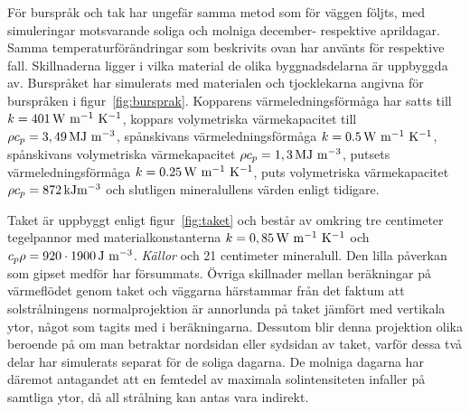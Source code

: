 För burspråk och tak har ungefär samma metod som för väggen följts, med simuleringar motsvarande soliga och
molniga december- respektive aprildagar. Samma temperaturförändringar som beskrivits ovan har använts för
respektive fall. Skillnaderna ligger i vilka material de olika byggnadsdelarna är uppbyggda av.
Burspråket har simulerats med materialen och tjocklekarna angivna för burspråken i figur~\ref{fig:bursprak}.
Kopparens värmeledningsförmåga har satts till $k=\unit[401]{W~m^{-1}~K^{-1}}$, koppars volymetriska värmekapacitet till $\rho c_p = \unit[3,49]{MJ~m^{-3}}$, spånskivans värmeledningsförmåga $k = \unit[0.5]{W~m^{-1}~K^{-1}}$, spånskivans volymetriska
värmekapacitet $\rho c_p = \unit[1,3]{MJ~m^{-3}}$, putsets värmeledningsförmåga $k = \unit[0.25]{W~m^{-1}~K^{-1}}$, puts volymetriska
värmekapacitet $\rho c_p = \unit[872]{kJm^{-3}}$ och slutligen mineralullens värden
enligt tidigare.
\cite{engineeringcom}\cite{kandidatarbete2010}\cite{engineeringtoolboxthermalconductivity}\cite{engineeringtoolboxspecificheat}

Taket är uppbyggt enligt figur~\ref{fig:taket} och består av omkring tre centimeter tegelpannor med materialkonstanterna $k = \unit[0,85]{W~m^{-1}~K^{-1}}$ och $c_p\rho = \unit[920\cdot 1900]{J~m^{-3}}$.
\emph{\color{red} Källor} och 21 centimeter mineralull. Den lilla påverkan som gipset medför har försummats. Övriga skillnader mellan beräkningar på värmeflödet genom taket och väggarna härstammar från det faktum att solstrålningens normalprojektion är annorlunda på taket jämfört med vertikala ytor, något som tagits med i beräkningarna. Dessutom blir denna projektion olika beroende på om man betraktar nordsidan eller sydsidan av taket, varför dessa två delar har simulerats separat för de soliga dagarna. De molniga dagarna har däremot antagandet att en femtedel av maximala solintensiteten infaller på samtliga ytor, då all strålning kan antas vara indirekt.



